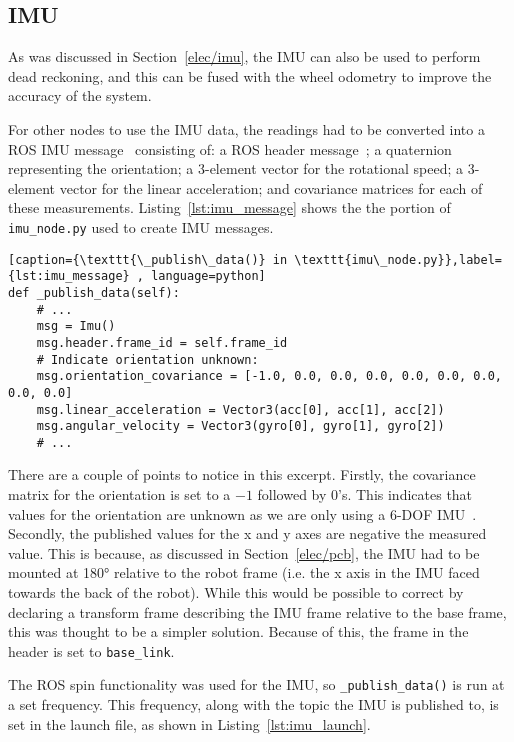 \subsection{IMU}\label{soft/odometry/imu}

As was discussed in Section~\ref{elec/imu}, the IMU can also be used to
perform dead reckoning, and this can be fused with the wheel odometry to
improve the accuracy of the system.

For other nodes to use the IMU data, the readings had to be converted into
a ROS IMU message~\cite[sensor\_msgs/Imu.msg]{ROSDocs} consisting of: a ROS header message~\cite[std\_msgs/Header.msg]{ROSDocs};
a quaternion representing the orientation; a 3-element vector for
the rotational speed; a 3-element vector for the linear
acceleration; and covariance matrices for each of these measurements.
Listing~\ref{lst:imu_message} shows the the portion of \verb|imu_node.py| used to create IMU messages.


\begin{lstlisting}[caption={\texttt{\_publish\_data()} in \texttt{imu\_node.py}},label={lst:imu_message} , language=python]
def _publish_data(self):
    # ...
    msg = Imu()
    msg.header.frame_id = self.frame_id
    # Indicate orientation unknown:
    msg.orientation_covariance = [-1.0, 0.0, 0.0, 0.0, 0.0, 0.0, 0.0, 0.0, 0.0]
    msg.linear_acceleration = Vector3(acc[0], acc[1], acc[2])
    msg.angular_velocity = Vector3(gyro[0], gyro[1], gyro[2])
    # ...
\end{lstlisting}

There are a couple of points to notice in this excerpt. Firstly, the
covariance matrix for the orientation is set to a $-1$ followed by 0's.
This indicates that values for the orientation are unknown as we are only
using a 6-DOF IMU~\cite[sensor\_msgs/Imu.msg]{ROSDocs}. Secondly, the published values for the
x and y axes are negative the measured value. This is because, as
discussed in Section~\ref{elec/pcb}, the IMU had to be mounted at
\ang{180} relative to the robot frame (i.e. the x axis in the IMU faced
towards the back of the robot). While this would be possible to correct by
declaring a transform frame describing the IMU frame relative to the base
frame, this was thought to be a simpler solution. Because of this, the
frame in the header is set to \verb|base_link|.

The ROS spin functionality was used for the IMU, so
\verb|_publish_data()| is run at a set
frequency. This frequency, along with the topic the
IMU is published to, is set in the launch file, as
shown in Listing~\ref{lst:imu_launch}.

